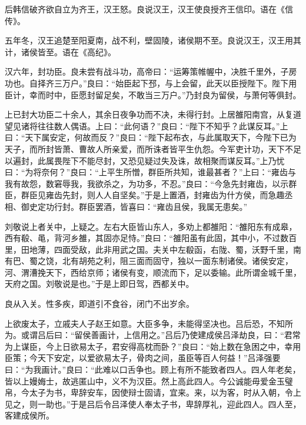 \documentclass[12pt,UTF8]{ctexbook}
\begin{document}
后韩信破齐欲自立为齐王，汉王怒。良说汉王，汉王使良授齐王信印。语在《信传》。



五年冬，汉王追楚至阳夏南，战不利，壁固陵，诸侯期不至。良说汉王，汉王用其计，诸侯皆至。语在《高纪》。



汉六年，封功臣。良未尝有战斗功，高帝曰：“运筹策帷幄中，决胜千里外，子房功也。自择齐三万户。”良曰：“始臣起下邳，与上会留，此天以臣授陛下。陛下用臣计，幸而时中，臣愿封留足矣，不敢当三万户。”乃封良为留侯，与萧何等俱封。



上已封大功臣二十余人，其余日夜争功而不决，未得行封。上居雒阳南宫，从复道望见诸将往往数人偶语。上曰：“此何语？”良曰：“陛下不知乎？此谋反耳。”上曰：“天下属安定，何故而反？”良曰：“陛下起布衣，与此属取天下，今陛下已为天子，而所封皆萧、曹故人所亲爱，而所诛者皆平生仇怨。今军吏计功，天下不足以遍封，此属畏陛下不能尽封，又恐见疑过失及诛，故相聚而谋反耳。”上乃忧曰：“为将奈何？”良曰：“上平生所憎，群臣所共知，谁最甚者？”上曰：“雍齿与我有故怨，数窘辱我，我欲杀之，为功多，不忍。”良曰：“今急先封雍齿，以示群臣，群臣见雍齿先封，则人人自坚矣。”于是上置酒，封雍齿为什方侯，而急趣丞相、御史定功行封。群臣罢酒，皆喜曰：“雍齿且侯，我属无患矣。”



刘敬说上者关中，上疑之。左右大臣皆山东人，多劝上都雒阳：“雒阳东有成皋，西有殽、黾，背河乡雒，其固亦足恃。”良曰：“雒阳虽有此固，其中小，不过数百里，田地薄，四面受敌，此非用武之国。夫关中左殽函，右陇、蜀，沃野千里，南有巴、蜀之饶，北有胡苑之利，阻三面而固守，独以一面东制诸侯。诸侯安定，河、渭漕挽天下，西给京师；诸侯有变，顺流而下，足以委输。此所谓金城千里，天府之国。刘敬说是也。”于是上即日驾，西都关中。



良从入关。性多疾，即道引不食谷，闭门不出岁余。



上欲废太子，立戚夫人子赵王如意。大臣多争，未能得坚决也。吕后恐，不知所为。或谓吕后曰：“留侯善画计，上信用之。”吕后乃使建成侯吕泽劫良，曰：“君常为上谋臣，今上日欲易太子，君安得高枕而卧？”良曰：“始上数在急困之中，幸用臣策；今天下安定，以爱欲易太子，骨肉之间，虽臣等百人何益！”吕泽强要曰：“为我画计。”良曰：“此难以口舌争也。顾上有所不能致者四人。四人年老矣，皆以上嫚娒士，故逃匿山中，义不为汉臣。然上高此四人。今公诚能毋爱金玉璧帛，今太子为书，卑辞安车，因使辩士固请，宜来。来，以为客，时从入朝，令上见之，则一助也。”于是吕后令吕泽使人奉太子书，卑辞厚礼，迎此四人。四人至，客建成侯所。
\end{document}
